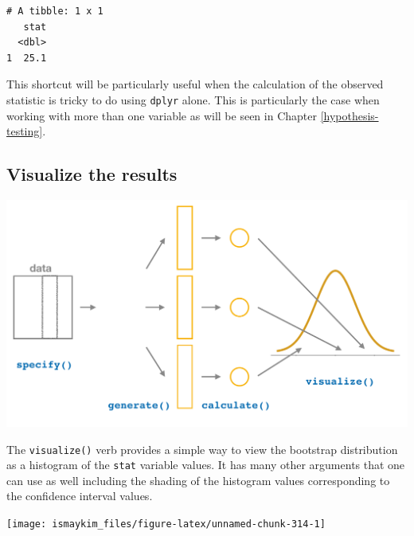 \documentclass[12pt,]{krantz}
\makeatletter
\newenvironment{Shaded}{\begin{snugshade}}{\end{snugshade}}
\newcommand{\KeywordTok}[1]{\textcolor[rgb]{0.27,0.27,0.27}{\textbf{#1}}}
\newcommand{\StringTok}[1]{\textcolor[rgb]{0.5,0.5,0.5}{#1}}
\newcommand{\OperatorTok}[1]{\textcolor[rgb]{0.43,0.43,0.43}{\textbf{#1}}}
\newcommand{\NormalTok}[1]{#1}
\newenvironment{kframe}{%
\medskip{}
\setlength{\fboxsep}{.8em}
 \def\at@end@of@kframe{}%
 \ifinner\ifhmode%
  \def\at@end@of@kframe{\end{minipage}}%
  \begin{minipage}{\columnwidth}%
 \fi\fi%
 \def\FrameCommand##1{\hskip\@totalleftmargin \hskip-\fboxsep
 \colorbox{shadecolor}{##1}\hskip-\fboxsep
     \hskip-\linewidth \hskip-\@totalleftmargin \hskip\columnwidth}%
 \MakeFramed {\advance\hsize-\width
   \@totalleftmargin\z@ \linewidth\hsize
   \@setminipage}}%
 {\par\unskip\endMakeFramed%
 \at@end@of@kframe}
\renewenvironment{Shaded}{\begin{kframe}}{\end{kframe}}
\theoremstyle{definition}
\theoremstyle{definition}
\theoremstyle{definition}
\theoremstyle{remark}
\makeatother
\begin{document}
\begin{verbatim}
# A tibble: 1 x 1
   stat
  <dbl>
1  25.1
\end{verbatim}

This shortcut will be particularly useful when the calculation of the
observed statistic is tricky to do using \texttt{dplyr} alone. This is
particularly the case when working with more than one variable as will
be seen in Chapter \ref{hypothesis-testing}.

\subsection{Visualize the results}\label{visualize-the-results}

\begin{center}\includegraphics[width=\textwidth]{images/flowcharts/infer/visualize} \end{center}

The \texttt{visualize()} verb provides a simple way to view the
bootstrap distribution as a histogram of the \texttt{stat} variable
values. It has many other arguments that one can use as well including
the shading of the histogram values corresponding to the confidence
interval values.

\begin{Shaded}
\end{Shaded}

\begin{center}\texttt{[image: ismaykim\_files/figure-latex/unnamed-chunk-314-1]} \end{center}
\end{document}
